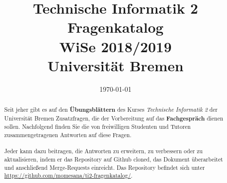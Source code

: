 \documentclass[12pt,a4paper,ngerman]{scrartcl}
\title{Technische Informatik 2 \\ Fragenkatalog \\ WiSe 2018/2019 \\[5pt] \Large{Universität Bremen}}
\date{\today}
\makeatletter
\newcommand{\question}[1]{
	\subsection[\truncate{0.80\textwidth}{#1}]{
	\textcolor{blue}{#1}}}
\newenvironment{multilinequestion}[1][]
	{\subsection[\truncate{0.80\textwidth}{#1}]{\textcolor{blue}{#1}} \color{blue}}
	{}
\newcommand\mystuff@footnotebuffer{}
\newcounter{mystuff@footnote}
\newcommand\bufferfootnotes{
	\let\mystuff@footnoteold\footnote
	\setcounter{mystuff@footnote}{\thefootnote}
	\renewcommand\mystuff@footnotebuffer{}
	\renewcommand{\footnote}[1]{
		\footnotemark
		\g@addto@macro{\mystuff@footnotebuffer}{
			\stepcounter{mystuff@footnote}
			\protect\footnotetext[\themystuff@footnote]{##1}
		}
	}
}
\newcommand\stopbufferingfootnotes{%
	\mystuff@footnotebuffer%
	\renewcommand{\footnote}[1]{\mystuff@footnoteold{##1}}%
}
\newenvironment{answer}
                {\bufferfootnotes }
                {\stopbufferingfootnotes}
\makeatother
\begin{document}
\maketitle

\begin{abstract}
Seit jeher gibt es auf den \textbf{Übungsblättern} des Kurses \textit{Technische Informatik 2} der Universität Bremen Zusatzfragen, die der Vorbereitung auf das \textbf{Fachgespräch} dienen sollen. Nachfolgend finden Sie die von freiwilligen Studenten und Tutoren zusammengetragenen Antworten auf diese Fragen.

\paragraph*{}
Jeder kann dazu beitragen, die Antworten zu erweitern, zu verbessern oder zu aktualisieren, indem er das Repository auf Github cloned, das Dokument überarbeitet und anschließend Merge-Requests einreicht. Das Repository befindet sich unter  \url{https://github.com/momesana/ti2-fragenkatalog/}.
\end{abstract}

\newpage

\tableofcontents 

%
%








\end{document}

